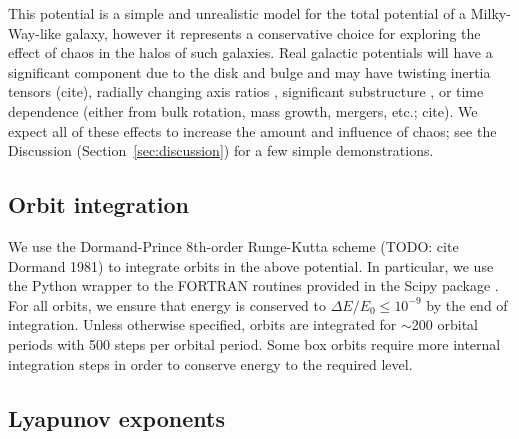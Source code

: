 \documentclass[letterpaper,12pt,preprint]{aastex}
\begin{document}
This potential is a simple and unrealistic model for the total potential of a Milky-Way-like galaxy, however it represents a conservative choice for exploring the effect of chaos in the halos of such galaxies. Real galactic potentials will have a significant component due to the disk and bulge and may have twisting inertia tensors (cite), radially changing axis ratios \citep[e.g.,][]{veraciro11}, significant substructure \citep{zemp09}, or time dependence (either from bulk rotation, mass growth, mergers, etc.; cite). We expect all of these effects to increase the amount and influence of chaos; see the Discussion (Section~\ref{sec:discussion}) for a few simple demonstrations.

\subsection{Orbit integration}\label{sec:integration}

We use the Dormand-Prince 8th-order Runge-Kutta scheme (TODO: cite Dormand 1981) to integrate orbits in the above potential. In particular, we use the Python wrapper to the FORTRAN routines provided in the Scipy package \citep{scipy}. For all orbits, we ensure that energy is conserved to $\Delta E/E_0 \leq 10^{-9}$ by the end of integration. Unless otherwise specified, orbits are integrated for $\sim$200 orbital periods with 500 steps per orbital period. Some box orbits require more internal integration steps in order to conserve energy to the required level. 

\subsection{Lyapunov exponents}
\end{document}
